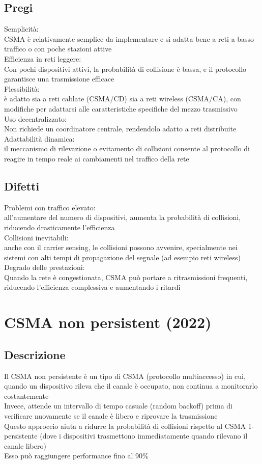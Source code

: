 \documentclass[10pt,oneside,a4paper]{article}
\begin{document}
\subsection{Pregi}
Semplicità:\\
CSMA è relativamente semplice da implementare e si adatta bene a reti a basso traffico o con poche stazioni attive\\
Efficienza in reti leggere:\\
Con pochi dispositivi attivi, la probabilità di collisione è bassa, e il protocollo garantisce una trasmissione efficace\\
Flessibilità:\\
è adatto sia a reti cablate (CSMA/CD) sia a reti wireless (CSMA/CA), con modifiche per adattarsi alle caratteristiche specifiche del mezzo trasmissivo\\
Uso decentralizzato:\\
Non richiede un coordinatore centrale, rendendolo adatto a reti distribuite\\
Adattabilità dinamica:\\
il meccanismo di rilevazione o evitamento di collisioni consente al protocollo di reagire in tempo reale ai cambiamenti nel traffico della rete
\subsection{Difetti}
Problemi con traffico elevato:\\
all'aumentare del numero di dispositivi, aumenta la probabilità di collisioni, riducendo drasticamente l'efficienza\\
Collisioni inevitabili:\\
anche con il carrier sensing, le collisioni possono avvenire, specialmente nei sistemi con alti tempi di propagazione del segnale (ad esempio reti wireless)\\
Degrado delle prestazioni:\\
Quando la rete è congestionata, CSMA può portare a ritrasmissioni frequenti, riducendo l'efficienza complessiva e aumentando i ritardi
\section{CSMA non persistent (2022)}
\subsection{Descrizione}
Il CSMA non persistente è un tipo di CSMA (protocollo multiaccesso) in cui, quando un dispositivo rileva che il canale è occupato, non continua a monitorarlo costantemente\\
Invece, attende un intervallo di tempo casuale (random backoff) prima di verificare nuovamente se il canale è libero e riprovare la trasmissione\\
Questo approccio aiuta a ridurre la probabilità di collisioni rispetto al CSMA 1-persistente (dove i dispositivi trasmettono immediatamente quando rilevano il canale libero)\\
Esso può raggiungere performance fino al 90$\%$
\end{document}
